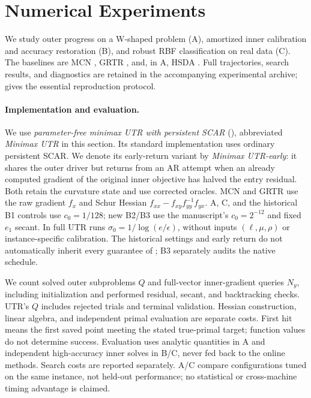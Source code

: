 \section{Numerical Experiments}
\label{sec:numerical-experiments}

We study outer progress on a W-shaped problem (A), amortized inner calibration
and accuracy restoration (B), and robust RBF
classification on real data (C). The baselines are MCN
\citep{luo2022finding}, GRTR \citep{wang2025gradient}, and, in A, HSDA
\citep{chen2026hsda}. Full trajectories, search results, and diagnostics
are retained in the accompanying experimental archive;
 gives the essential reproduction protocol.

\paragraph{Implementation and evaluation.}
We use \emph{parameter-free minimax UTR with persistent SCAR}
(), abbreviated \emph{Minimax UTR}
in this section. Its standard implementation uses ordinary persistent
SCAR. We denote its early-return variant by \emph{Minimax UTR-early}:
it shares the outer driver but returns from an AR attempt when an
already computed gradient of the original inner objective has halved
the entry residual. Both retain the curvature state and use corrected
oracles. MCN and GRTR use the raw gradient $f_x$ and Schur Hessian
$f_{xx}-f_{xy}f_{yy}^{-1}f_{yx}$. A, C, and the historical B1 controls use $c_0=1/128$;
new B2/B3 use the manuscript's $c_0=2^{-12}$ and fixed $e_1$ secant.
In full UTR runs $\sigma_0=1/\log(e/\epsilon)$, without inputs
$(\ell,\mu,\rho)$ or instance-specific calibration. The historical
settings and early return do not automatically inherit every guarantee
of ; B3 separately audits the native schedule.

We count solved outer subproblems $Q$ and full-vector inner-gradient
queries $N_y$, including initialization and performed residual, secant,
and backtracking checks. UTR's $Q$ includes rejected trials and terminal
validation. Hessian construction, linear algebra, and independent primal
evaluation are separate costs. First hit means the first saved point
meeting the stated true-primal target; function values do not determine
success. Evaluation uses analytic quantities in A and independent
high-accuracy inner solves in B/C, never fed back to the online methods.
Search costs are reported separately. A/C compare configurations tuned
on the same instance, not held-out performance; no statistical or
cross-machine timing advantage is claimed.

